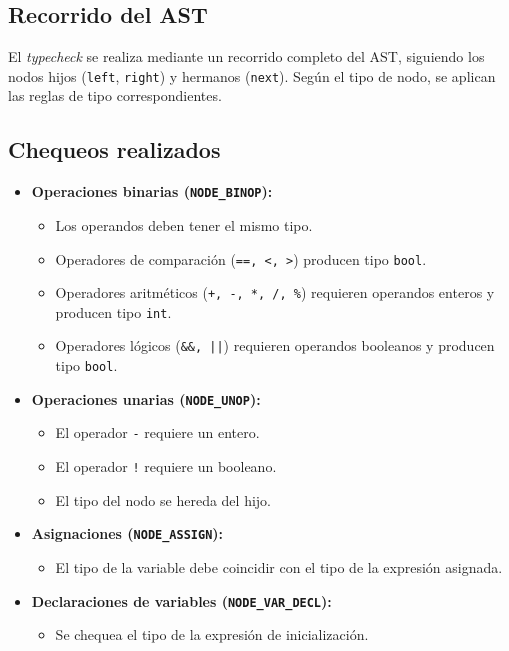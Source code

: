 \documentclass[12pt,a4paper]{article}
\begin{document}
\subsection{Recorrido del AST}
El \textit{typecheck} se realiza mediante un recorrido completo del AST, siguiendo los nodos hijos (\texttt{left}, \texttt{right}) y hermanos (\texttt{next}). Según el tipo de nodo, se aplican las reglas de tipo correspondientes.

\subsection{Chequeos realizados}

\begin{itemize}
    \item \textbf{Operaciones binarias (\texttt{NODE\_BINOP}):} 
        \begin{itemize}
            \item Los operandos deben tener el mismo tipo.
            \item Operadores de comparación (\texttt{==, <, >}) producen tipo \texttt{bool}.
            \item Operadores aritméticos (\texttt{+, -, *, /, \%}) requieren operandos enteros y producen tipo \texttt{int}.
            \item Operadores lógicos (\texttt{\&\&, ||}) requieren operandos booleanos y producen tipo \texttt{bool}.
        \end{itemize}

    \item \textbf{Operaciones unarias (\texttt{NODE\_UNOP}):}
        \begin{itemize}
            \item El operador \texttt{-} requiere un entero.
            \item El operador \texttt{!} requiere un booleano.
            \item El tipo del nodo se hereda del hijo.
        \end{itemize}

    \item \textbf{Asignaciones (\texttt{NODE\_ASSIGN}):} 
        \begin{itemize}
            \item El tipo de la variable debe coincidir con el tipo de la expresión asignada.
        \end{itemize}

    \item \textbf{Declaraciones de variables (\texttt{NODE\_VAR\_DECL}):}
        \begin{itemize}
            \item Se chequea el tipo de la expresión de inicialización.
        \end{itemize}


\end{itemize}
\end{document}
